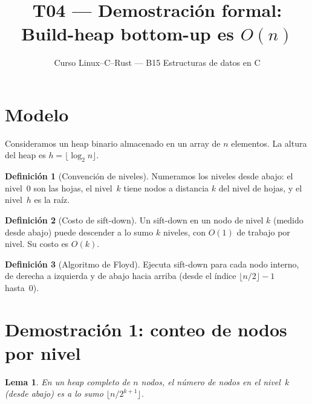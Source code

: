 \documentclass[11pt, letterpaper]{article}
\title{%
  T04 --- Demostración formal:\\[4pt]
  Build-heap bottom-up es $O(n)$
}
\author{Curso Linux--C--Rust --- B15 Estructuras de datos en C}
\date{}
\theoremstyle{definition}
\newtheorem{definition}{Definición}[section]
\theoremstyle{plain}
\newtheorem{lemma}[theorem]{Lema}
\theoremstyle{remark}
\begin{document}
\maketitle
\tableofcontents

\section{Modelo}

Consideramos un heap binario almacenado en un array de $n$ elementos.
La altura del heap es $h = \lfloor \log_2 n \rfloor$.

\begin{definition}[Convención de niveles]
Numeramos los niveles desde abajo: el nivel~0 son las hojas, el
nivel~$k$ tiene nodos a distancia $k$ del nivel de hojas, y el
nivel~$h$ es la raíz.
\end{definition}

\begin{definition}[Costo de sift-down]
Un sift-down en un nodo de nivel $k$ (medido desde abajo) puede
descender a lo sumo $k$ niveles, con $O(1)$ de trabajo por nivel.
Su costo es $O(k)$.
\end{definition}

\begin{definition}[Algoritmo de Floyd]
Ejecuta sift-down para cada nodo interno, de derecha a izquierda y
de abajo hacia arriba (desde el índice
$\lfloor n/2 \rfloor - 1$ hasta~0).
\end{definition}

\section{Demostración 1: conteo de nodos por nivel}

\begin{lemma}\label{lem:nodes-per-level}
En un heap completo de $n$ nodos, el número de nodos en el nivel~$k$
(desde abajo) es a lo sumo $\lfloor n / 2^{k+1} \rfloor$.
\end{lemma}
\end{document}
